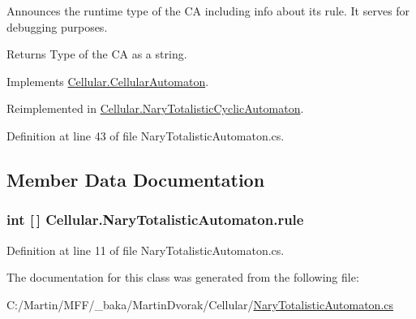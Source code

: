 Announces the runtime type of the C\+A including info about its rule. It serves for debugging purposes. 

\begin{DoxyReturn}{Returns}
Type of the C\+A as a string.
\end{DoxyReturn}


Implements \hyperlink{class_cellular_1_1_cellular_automaton_abe4b92fd405530c8a08cc07a3a19fff4}{Cellular.\+Cellular\+Automaton}.



Reimplemented in \hyperlink{class_cellular_1_1_nary_totalistic_cyclic_automaton_ac5c39cfb72386e3ab6132ab420091ae9}{Cellular.\+Nary\+Totalistic\+Cyclic\+Automaton}.



Definition at line 43 of file Nary\+Totalistic\+Automaton.\+cs.



\subsection{Member Data Documentation}
\hypertarget{class_cellular_1_1_nary_totalistic_automaton_a878c767c6823bd8ed8dc0f7d2ccb1fd2}{}
\subsubsection[{rule}]{\setlength{\rightskip}{0pt plus 5cm}int \mbox{[}$\,$\mbox{]} Cellular.\+Nary\+Totalistic\+Automaton.\+rule\hspace{0.3cm}{\ttfamily [protected]}}\label{class_cellular_1_1_nary_totalistic_automaton_a878c767c6823bd8ed8dc0f7d2ccb1fd2}


Definition at line 11 of file Nary\+Totalistic\+Automaton.\+cs.



The documentation for this class was generated from the following file\+:\begin{DoxyCompactItemize}
\item 
C\+:/\+Martin/\+M\+F\+F/\+\_\+baka/\+Martin\+Dvorak/\+Cellular/\hyperlink{_nary_totalistic_automaton_8cs}{Nary\+Totalistic\+Automaton.\+cs}\end{DoxyCompactItemize}

